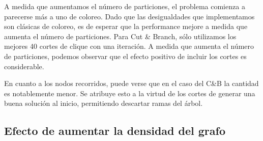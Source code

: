 A medida que aumentamos el número de particiones, el problema comienza a parecerse más a uno de coloreo. Dado que las desigualdades que implementamos son clásicas de coloreo, es de esperar que la performance mejore a medida que aumenta el número de particiones. Para Cut \& Branch, sólo utilizamos los mejores 40 cortes de clique con una iteración. A medida que aumenta el número de particiones, podemos observar que el efecto positivo de incluir los cortes es considerable.

En cuanto a los nodos recorridos, puede verse que en el caso del C\&B la cantidad es notablemente menor. Se atribuye esto a la virtud de los cortes de generar una buena solución al inicio, permitiendo descartar ramas del árbol.

\subsection{Efecto de aumentar la densidad del grafo}

